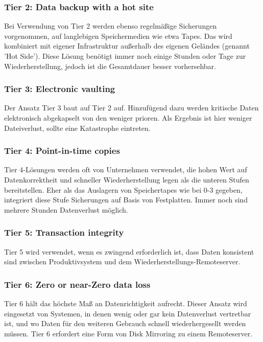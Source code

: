 \documentclass[letterpaper, 12pt]{article}
\let\tempsubsubsection\subsubsection
\renewcommand\subsubsection[1]{\vspace{0cm}\tempsubsubsection{#1}\vspace{0cm}}
\begin{document}
\subsubsection{Tier 2: Data backup with a hot site}

Bei Verwendung von Tier 2 werden ebenso regelmäßige Sicherungen vorgenommen, auf langlebigen
Speichermedien wie etwa Tapes. Das wird kombiniert mit eigener Infrastruktur außerhalb des
eigenen Geländes (genannt ’Hot Side’). Diese Lösung benötigt immer noch einige Stunden oder Tage zur Wiederherstellung,
jedoch ist die Gesamtdauer besser vorhersehbar.

\subsubsection{Tier 3: Electronic vaulting}

Der Ansatz Tier 3 baut auf Tier 2 auf. Hinzufügend dazu werden kritische Daten elektronisch abgekapselt
von den weniger prioren. Als Ergebnis ist hier weniger Dateiverlust, sollte eine Katastrophe
eintreten.

\subsubsection{Tier 4: Point-in-time copies}

Tier 4-Lösungen werden oft von Unternehmen verwendet, die hohen Wert auf Datenkorrektheit
und schneller Wiederherstellung legen als die unteren Stufen bereitstellen. Eher als das Auslagern
von Speichertapes wie bei 0-3 gegeben, integriert diese Stufe Sicherungen auf Basis von
Festplatten. Immer noch sind mehrere Stunden Datenverlust möglich.

\subsubsection{Tier 5: Transaction integrity}

Tier 5 wird verwendet, wenn es zwingend erforderlich ist, dass Daten konsistent sind zwischen
Produktivsystem und dem Wiederherstellungs-Remoteserver. 

\subsubsection{Tier 6: Zero or near-Zero data loss}

Tier 6 hält das höchste Maß an Datenrichtigkeit aufrecht. Dieser Ansatz wird eingesetzt von Systemen,
in denen wenig oder gar kein Datenverlust vertretbar ist, und wo Daten für den weiteren
Gebrauch schnell wiederhergesellt werden müssen. Tier 6 erfordert eine Form von Disk Mirroring zu einem Remoteserver.
\end{document}

